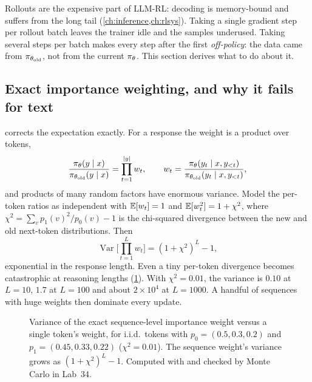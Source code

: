 Rollouts are the expensive part of LLM-RL: decoding is memory-bound and suffers from the long
tail (\cref{ch:inference,ch:rlsys}). Taking a single gradient step per rollout batch leaves
the trainer idle and the samples underused. Taking several steps per batch makes every step
after the first \emph{off-policy}: the data came from $\pi_{\theta_{\text{old}}}$, not from the current
$\pi_\theta$. This section derives what to do about it.

\subsection{Exact importance weighting, and why it fails for text}\label{sec:pg:is}

 corrects the expectation exactly. For a response the weight is a product over
tokens,
\begin{equation}
\frac{\pi_\theta(y\mid x)}{\pi_{\theta_{\text{old}}}(y\mid x)}=\prod_{t=1}^{|y|}w_t,\qquad
w_t=\frac{\pi_\theta(y_t\mid x,y_{<t})}{\pi_{\theta_{\text{old}}}(y_t\mid x,y_{<t})},
\end{equation}
and products of many random factors have enormous variance. Model the per-token ratios as
independent with $\mathbb{E}[w_t]=1$ and $\mathbb{E}[w_t^2]=1+\chi^2$, where $\chi^2=\sum_v p_1(v)^2/p_0(v)-1$ is
the chi-squared divergence between the new and old next-token distributions. Then
\begin{equation}
\operatorname{Var}\Big[\prod_{t=1}^{L}w_t\Big]=(1+\chi^2)^L-1 ,
\end{equation}
exponential in the response length. Even a tiny per-token divergence becomes catastrophic
at reasoning lengths (\cref{fig:pg:isvar}). With $\chi^2=0.01$, the variance is $0.10$ at
$L=10$, $1.7$ at $L=100$ and about $2\times10^4$ at $L=1000$. A handful of sequences with huge
weights then dominate every update.

\begin{figure}[t]
\centering
{}
\caption{Variance of the exact sequence-level importance weight versus a single token's
weight, for i.i.d.\ tokens with $p_0=(0.5,0.3,0.2)$ and $p_1=(0.45,0.33,0.22)$
($\chi^2=0.01$). The sequence weight's variance grows as $(1+\chi^2)^L-1$. Computed with
 and checked by Monte Carlo in Lab~34.}
\label{fig:pg:isvar}
\end{figure}

